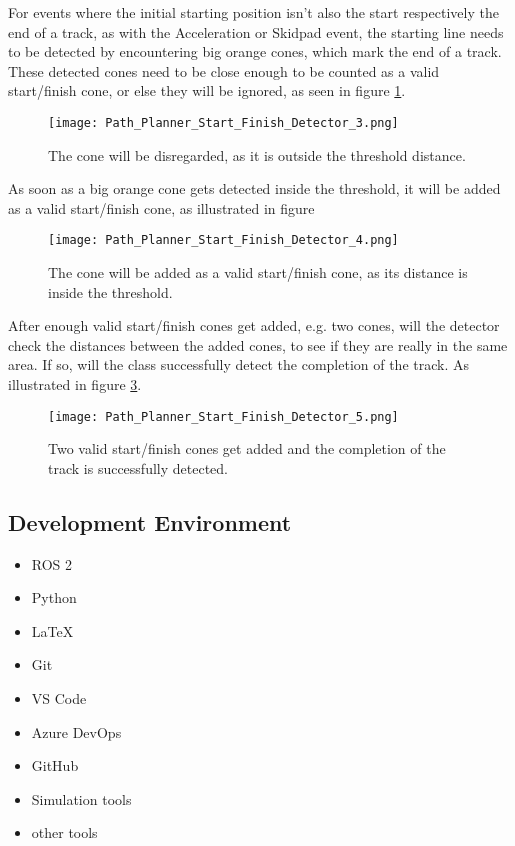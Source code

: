 For events where the initial starting position isn't also the start respectively the end of a track, as with the Acceleration or Skidpad event, the starting line needs to be detected by encountering big orange cones, which mark the end of a track. These detected cones need to be close enough to be counted as a valid start/finish cone, or else they will be ignored, as seen in figure \ref{fig:Path Planner Start Finish Detector 3}.
\begin{figure}[H]
    \centering
    \texttt{[image: Path\_Planner\_Start\_Finish\_Detector\_3.png]}
    \caption{The cone will be disregarded, as it is outside the threshold distance.}
    \label{fig:Path Planner Start Finish Detector 3}
\end{figure}
As soon as a big orange cone gets detected inside the threshold, it will be added as a valid start/finish cone, as illustrated in figure
\begin{figure}[H]
    \centering
    \texttt{[image: Path\_Planner\_Start\_Finish\_Detector\_4.png]}
    \caption{The cone will be added as a valid start/finish cone, as its distance is inside the threshold.}
    \label{fig:Path Planner Start Finish Detector 4}
\end{figure}
After enough valid start/finish cones get added, e.g. two cones, will the detector check the distances between the added cones, to see if they are really in the same area. If so, will the class successfully detect the completion of the track. As illustrated in figure \ref{fig:Path Planner Start Finish Detector 5}.
\begin{figure}[H]
    \centering
    \texttt{[image: Path\_Planner\_Start\_Finish\_Detector\_5.png]}
    \caption{Two valid start/finish cones get added and the completion of the track is successfully detected.}
    \label{fig:Path Planner Start Finish Detector 5}
\end{figure}

\subsection{Development Environment} \label{sec:Development Environment}

\begin{itemize}
    \item ROS 2
    \item Python
    \item LaTeX
    \item Git
    \item VS Code
    \item Azure DevOps
    \item GitHub
    \item Simulation tools
    \item other tools
\end{itemize}


